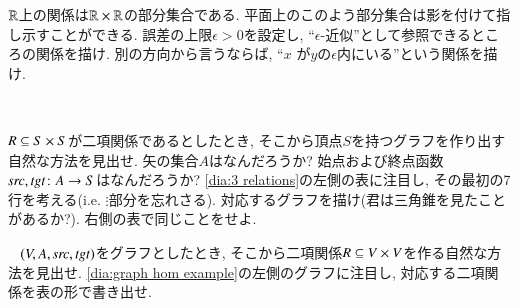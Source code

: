 \begin{exercise}
$\RR$上の関係は$\RR\times\RR$の部分集合である. 平面上のこのよう部分集合は影を付けて指し示すことができる. 誤差の上限$\epsilon>0$を設定し, ``$\epsilon$-近似''として参照できるところの関係を描け. 別の方向から言うならば, ``$x$ が$y$の$\epsilon$内にいる''という関係を描け.
\end{exercise}

\begin{exercise}[二項関係からグラフへ]\label{exc:rel to graph}~

\sexc $R\ss S\times S$が二項関係であるとしたとき, そこから頂点$S$を持つグラフを作り出す自然な方法を見出せ.
\next 矢の集合$A$はなんだろうか? 
\next 始点および終点函数$\src,\tgt\taking A\to S$はなんだろうか?
\next \eqref{dia:3 relations}の左側の表に注目し, その最初の7行を考える(i.e. $\vdots$部分を忘れさる). 対応するグラフを描け(君は三角錐を見たことがあるか?). 
\next 右側の表で同じことをせよ.
\endsexc
\end{exercise}

\begin{exercise}[グラフから二項関係へ]\label{ex:graph to rel}~
\sexc $(V,A,\src,\tgt)$をグラフとしたとき, そこから二項関係$R\ss V\times V$を作る自然な方法を見出せ.  
\next \eqref{dia:graph hom example}の左側のグラフに注目し, 対応する二項関係を表の形で書き出せ.
\endsexc
\end{exercise}

